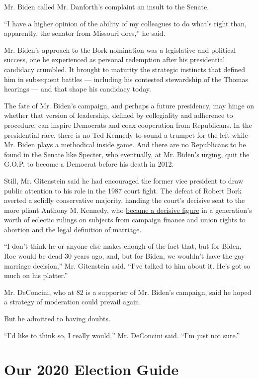 Mr. Biden called Mr. Danforth's complaint an insult to the Senate.

``I have a higher opinion of the ability of my colleagues to do what's
right than, apparently, the senator from Missouri does,'' he said.

Mr. Biden's approach to the Bork nomination was a legislative and
political success, one he experienced as personal redemption after his
presidential candidacy crumbled. It brought to maturity the strategic
instincts that defined him in subsequent battles --- including his
contested stewardship of the Thomas hearings --- and that shape his
candidacy today.

The fate of Mr. Biden's campaign, and perhaps a future presidency, may
hinge on whether that version of leadership, defined by collegiality and
adherence to procedure, can inspire Democrats and coax cooperation from
Republicans. In the presidential race, there is no Ted Kennedy to sound
a trumpet for the left while Mr. Biden plays a methodical inside game.
And there are no Republicans to be found in the Senate like Specter, who
eventually, at Mr. Biden's urging, quit the G.O.P. to become a Democrat
before his death in 2012.

Still, Mr. Gitenstein said he had encouraged the former vice president
to draw public attention to his role in the 1987 court fight. The defeat
of Robert Bork averted a solidly conservative majority, handing the
court's decisive seat to the more pliant Anthony M. Kennedy, who
\href{https://www.nytimes.com/2018/06/27/us/politics/anthony-kennedy-retire-supreme-court.html}{became
a decisive figure} in a generation's worth of eclectic rulings on
subjects from campaign finance and union rights to abortion and the
legal definition of marriage.

``I don't think he or anyone else makes enough of the fact that, but for
Biden, Roe would be dead 30 years ago, and, but for Biden, we wouldn't
have the gay marriage decision,'' Mr. Gitenstein said. ``I've talked to
him about it. He's got so much on his platter.''

Mr. DeConcini, who at 82 is a supporter of Mr. Biden's campaign, said he
hoped a strategy of moderation could prevail again.

But he admitted to having doubts.

``I'd like to think so, I really would,'' Mr. DeConcini said. ``I'm just
not sure.''

\hypertarget{our-2020-election-guide}{%
\section{Our 2020 Election Guide}\label{our-2020-election-guide}}

